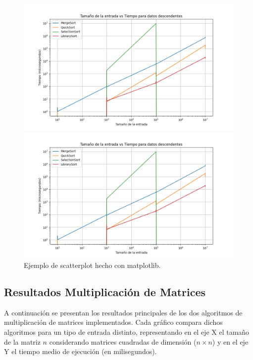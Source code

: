 \begin{figure}[H]
    \centering
    \begin{minipage}[t]{0.5\textwidth}
        \includegraphics[width=\textwidth]{../code/sorting/data/plots/descendente_plot.png}
    \end{minipage}%
    \begin{minipage}[t]{0.5\textwidth}
        \includegraphics[width=\textwidth]{../code/sorting/data/plots/descendente_plot.png}
     \end{minipage}%
    \caption{Ejemplo de scatterplot hecho con matplotlib.}
    \label{fig:sorting-descendente}
\end{figure}


\newpage

\subsection*{Resultados Multiplicación de Matrices}

A continuación se presentan los resultados principales de los dos algoritmos de multiplicación de matrices implementados. Cada gráfico compara dichos algoritmos para un tipo de entrada distinto, representando en el eje X el tamaño de la matriz $n$ considerando matrices cuadradas de dimensión ($n \times n$) y en el eje Y el tiempo medio de ejecución (en milisegundos).

